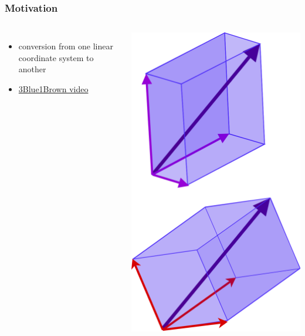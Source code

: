 \documentclass[aspectratio=169]{beamer}
\begin{document}
\begin{frame}
    \frametitle{Motivation}

    \begin{columns}
        \begin{itemize}
            \item conversion from one linear coordinate system to another
            \item \href{https://youtu.be/P2LTAUO1TdA?list=PLZHQObOWTQDPD3MizzM2xVFitgF8hE_ab}{3Blue1Brown video}
        \end{itemize}

        \includegraphics[width=0.5\textheight]{800px-3d_two_bases_same_vector.svg.png}
    \end{columns}
\end{frame}
\end{document}
